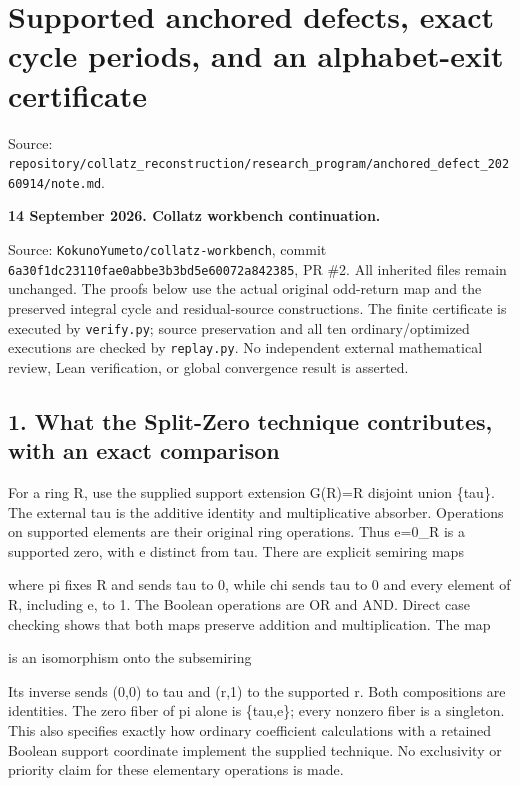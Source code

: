 \chapter{Supported anchored defects, exact cycle periods, and an
alphabet-exit certificate}
{\small\sffamily Source: \nolinkurl{repository/collatz_reconstruction/research_program/anchored_defect_20260914/note.md}.\par}


\textbf{14 September 2026. Collatz workbench continuation.}

Source: \nolinkurl{KokunoYumeto/collatz-workbench}, commit
\nolinkurl{6a30f1dc23110fae0abbe3b3bd5e60072a842385}, PR \#2. All
inherited files remain unchanged. The proofs below use the actual
original odd-return map and the preserved integral cycle and
residual-source constructions. The finite certificate is executed by
\nolinkurl{verify.py}; source preservation and all ten
ordinary/optimized executions are checked by \nolinkurl{replay.py}. No
independent external mathematical review, Lean verification, or global
convergence result is asserted.

\section{1. What the Split-Zero technique contributes, with an exact
comparison}

For a ring R, use the supplied support extension G(R)=R disjoint union
\{tau\}. The external tau is the additive identity and multiplicative
absorber. Operations on supported elements are their original ring
operations. Thus e=0\_R is a supported zero, with e distinct from tau.
There are explicit semiring maps


where pi fixes R and sends tau to 0, while chi sends tau to 0 and every
element of R, including e, to 1. The Boolean operations are OR and AND.
Direct case checking shows that both maps preserve addition and
multiplication. The map


is an isomorphism onto the subsemiring


Its inverse sends (0,0) to tau and (r,1) to the supported r. Both
compositions are identities. The zero fiber of pi alone is \{tau,e\};
every nonzero fiber is a singleton. This also specifies exactly how
ordinary coefficient calculations with a retained Boolean support
coordinate implement the supplied technique. No exclusivity or priority
claim for these elementary operations is made.

